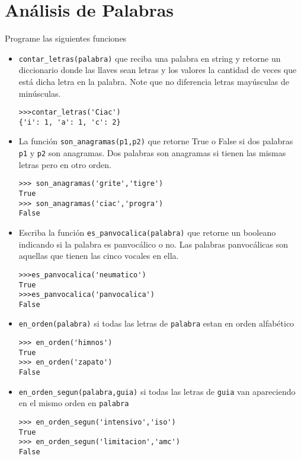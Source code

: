 \section{Análisis de Palabras}

Programe las siguientes funciones
\begin{itemize}

    \item \texttt{contar\_letras(palabra)} que reciba una palabra en string y retorne un diccionario donde las llaves sean letras y los valores la cantidad de veces que está dicha letra en la palabra. Note que no diferencia letras mayúsculas de minúsculas.
    
    \begin{lstlisting}[style=consola]
>>>contar_letras('Ciac')
{'i': 1, 'a': 1, 'c': 2}
    \end{lstlisting}
    
    \item La función \texttt{son\_anagramas(p1,p2)} que retorne True o False si dos palabras \texttt{p1} y \texttt{p2} son anagramas. Dos palabras son anagramas si tienen las mismas letras pero en otro orden. 
    
    \begin{lstlisting}[style=consola]
>>> son_anagramas('grite','tigre')
True
>>> son_anagramas('ciac','progra')
False
    \end{lstlisting}
    
    \item Escriba la función \texttt{es\_panvocalica(palabra)} que retorne un booleano indicando si la palabra es panvocálico o no. Las palabras panvocálicas son aquellas que tienen las cinco vocales en ella.
    
    \begin{lstlisting}[style=consola]
>>>es_panvocalica('neumatico')
True
>>>es_panvocalica('panvocalica')
False
    \end{lstlisting}
    
    \item \texttt{en\_orden(palabra)} si todas las letras de \texttt{palabra} estan en orden alfabético
    \begin{lstlisting}[style=consola]
>>> en_orden('himnos')
True
>>> en_orden('zapato')
False
    \end{lstlisting}
    
    \item \texttt{en\_orden\_segun(palabra,guia)} si todas las letras de \texttt{guia} van apareciendo en el mismo orden en \texttt{palabra}
    \begin{lstlisting}[style=consola]
>>> en_orden_segun('intensivo','iso')
True
>>> en_orden_segun('limitacion','amc')
False
    \end{lstlisting}
    

\end{itemize}
